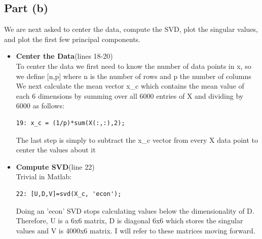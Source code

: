 \documentclass{article}
\begin{document}
\subsection*{Part (b)}
We are next asked to center the data, compute the SVD, plot the singular values, and plot the first few principal components.  
\begin{itemize}
    \item \textbf{Center the Data}(lines 18-20) \\
    To center the data we first need to know the number of data points in x, so we define [n,p] where n is the number of rows and p the number of columns\\
    We next calculate the mean vector x\_c which contains the mean value of each 6 dimensions by summing over all 6000 entries of X and dividing by 6000 as follows:\\
    \begin{verbatim}19: x_c = (1/p)*sum(X(:,:),2);  \end{verbatim}
    The last step is simply to subtract the x\_c vector from every X data point to center the values about it
    
    \item \textbf{Compute SVD}(line 22) \\
    Trivial in Matlab:
    \begin{verbatim}22: [U,D,V]=svd(X_c, 'econ');    \end{verbatim}
    Doing an 'econ' SVD stops calculating values below the dimensionality of D. Therefore, U is a 6x6 matrix, D is diagonal 6x6 which stores the singular values and V is 4000x6 matrix.  I will refer to these matrices moving forward.
    

\end{itemize}
\end{document}
